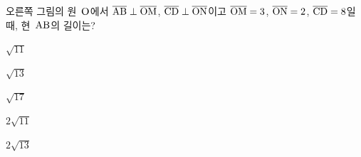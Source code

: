 \noindent\begin{minipage}[t]{0.58\linewidth}\vspace{0pt}\raggedright 오른쪽 그림의 원~$\mathrm{O}$에서 $\overline{\mathrm{AB}}\perp\overline{\mathrm{OM}}$, $\overline{\mathrm{CD}}\perp\overline{\mathrm{ON}}$이고 $\overline{\mathrm{OM}}=3$, $\overline{\mathrm{ON}}=2$, $\overline{\mathrm{CD}}=8$일 때, 현~$\mathrm{AB}$의 길이는?\end{minipage}\hfill\begin{minipage}[t]{0.4\linewidth}\vspace{0pt}\centering \resizebox{\ifdim\width>\linewidth\linewidth\else\width\fi}{!}{}\end{minipage}\par
\begin{choicesii}{\rule[-3ex]{0pt}{8ex}$\sqrt{11}$}{\rule[-3ex]{0pt}{8ex}$\sqrt{13}$}{\rule[-3ex]{0pt}{8ex}$\sqrt{17}$}{\rule[-3ex]{0pt}{8ex}$2\sqrt{11}$}{\rule[-3ex]{0pt}{8ex}$2\sqrt{13}$}\end{choicesii}
